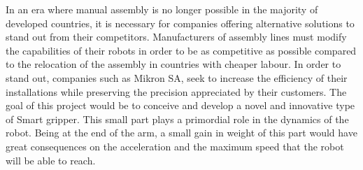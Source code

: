 %
%

In an era where manual assembly is no longer possible in the majority of developed countries, it is necessary for companies offering alternative solutions to stand out from their competitors. Manufacturers of assembly lines must modify the capabilities of their robots in order to be as competitive as possible compared to the relocation of the assembly in countries with cheaper labour. In order to stand out, companies such as Mikron SA, seek to increase the efficiency of their installations while preserving the precision appreciated by their customers. The goal of this project would be to conceive and develop a novel and innovative type of Smart gripper. This small part plays a primordial role in the dynamics of the robot. Being at the end of the arm, a small gain in weight of this part would have great consequences on the acceleration and the maximum speed that the robot will be able to reach.

